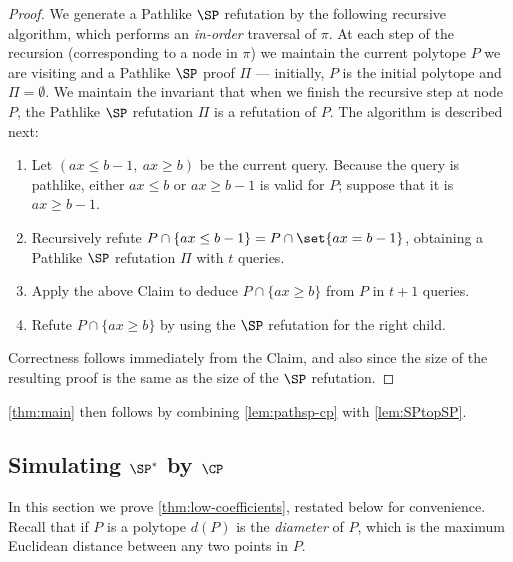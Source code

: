 \documentclass[11pt]{article}
\begin{document}
\begin{proof}
	We generate a Pathlike $\SP$ refutation by the following recursive algorithm, which performs an \emph{in-order} traversal of $\pi$. 
	At each step of the recursion (corresponding to a node in $\pi$) we maintain the current polytope $P$ we are visiting and a Pathlike $\SP$ proof $\Pi$ --- initially, $P$ is the initial polytope and $\Pi = \emptyset$. 
	We maintain the invariant that when we finish the recursive step at node $P$, the Pathlike $\SP$ refutation $\Pi$ is a refutation of $P$. 
	The algorithm is described next:
	\begin{enumerate}
		\item Let $(ax \leq b-1,~ ax \geq b)$ be the current query. Because the query is pathlike, either $ax \leq b$ or $ax \geq b-1$ is valid for $P$; suppose that it is $ax \geq b-1$. 
		\item Recursively refute $P \cap \{ ax \leq b-1\} = P \cap \set{ax = b-1}$, obtaining a Pathlike $\SP$ refutation $\Pi$ with $t$ queries. 
		\item Apply the above Claim to deduce $P \cap \{ax \geq b\}$ from $P$ in $t+1$ queries. 
		\item Refute $P \cap \{ ax \geq b\}$ by using the $\SP$ refutation for the right child. 
	\end{enumerate}
	Correctness follows immediately from the Claim, and also since the size of the resulting proof is the same as the size of the $\SP$ refutation. 		
	\end{proof}
	
	\autoref{thm:main} then follows by combining \autoref{lem:pathsp-cp} with \autoref{lem:SPtopSP}.


\subsection{Simulating \texorpdfstring{$\SP^*$}{SP*} by
          \texorpdfstring{$\CP$}{CP}}
\label{sec:quasipoly-simulation}
In this section we prove \autoref{thm:low-coefficients}, restated below for convenience.
Recall that if $P$ is a polytope $d(P)$ is the \emph{diameter} of $P$, which is the maximum Euclidean distance between any two points in $P$.

\lowcoefficients*
\end{document}
